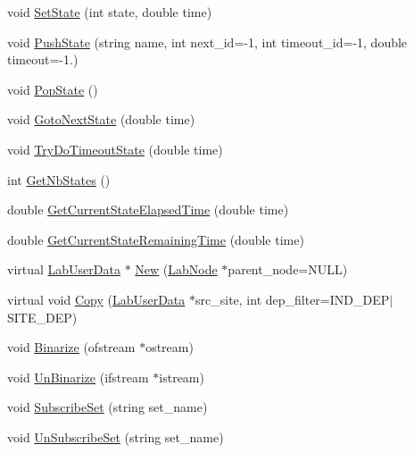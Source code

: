 \begin{DoxyCompactItemize}
\item 
void \hyperlink{classelps_1_1_lab_site_base_a71fa97f33232e778e106893e5cfd80e3}{Set\+State} (int state, double time)
\item 
void \hyperlink{classelps_1_1_lab_site_base_a995ebf491f8c5a79a963e7b1dc439ee1}{Push\+State} (string name, int next\+\_\+id=-\/1, int timeout\+\_\+id=-\/1, double timeout=-\/1.)
\item 
void \hyperlink{classelps_1_1_lab_site_base_ad51a610f79abd18515d7d3a7558de3b3}{Pop\+State} ()
\item 
void \hyperlink{classelps_1_1_lab_site_base_ab0d008b5668186fcd06ebe42997407b0}{Goto\+Next\+State} (double time)
\item 
void \hyperlink{classelps_1_1_lab_site_base_aacb4f452d2d1c01750f27426080d14f9}{Try\+Do\+Timeout\+State} (double time)
\item 
int \hyperlink{classelps_1_1_lab_site_base_a079b22b365fd919d87185485077e00c9}{Get\+Nb\+States} ()
\item 
double \hyperlink{classelps_1_1_lab_site_base_a41815ef8d2c7632ca48f8aba1ad8cd35}{Get\+Current\+State\+Elapsed\+Time} (double time)
\item 
double \hyperlink{classelps_1_1_lab_site_base_a9d2f618e14cf83c70f875d0c913c5f73}{Get\+Current\+State\+Remaining\+Time} (double time)
\item 
virtual \hyperlink{classelps_1_1_lab_user_data}{Lab\+User\+Data} $\ast$ \hyperlink{classelps_1_1_lab_site_base_ae0cbc57a3fca186709114f68f693b199}{New} (\hyperlink{classelps_1_1_lab_node}{Lab\+Node} $\ast$parent\+\_\+node=N\+U\+L\+L)
\item 
virtual void \hyperlink{classelps_1_1_lab_site_base_a0eee9af7ea7e99923fb403f031c028ca}{Copy} (\hyperlink{classelps_1_1_lab_user_data}{Lab\+User\+Data} $\ast$src\+\_\+site, int dep\+\_\+filter=I\+N\+D\+\_\+\+D\+E\+P$\vert$S\+I\+T\+E\+\_\+\+D\+E\+P)
\item 
void \hyperlink{classelps_1_1_lab_site_base_a42e30841600ed1e45dcd2c1c2a3071e8}{Binarize} (ofstream $\ast$ostream)
\item 
void \hyperlink{classelps_1_1_lab_site_base_ad1b2721336db27de86213769b78d3ccd}{Un\+Binarize} (ifstream $\ast$istream)
\item 
void \hyperlink{classelps_1_1_lab_site_base_a655d24550c8ff07788422ca4be7116ab}{Subscribe\+Set} (string set\+\_\+name)
\item 
void \hyperlink{classelps_1_1_lab_site_base_a6b3062ace04c2750b65d103535cff60b}{Un\+Subscribe\+Set} (string set\+\_\+name)
\item 

\end{DoxyCompactItemize}
